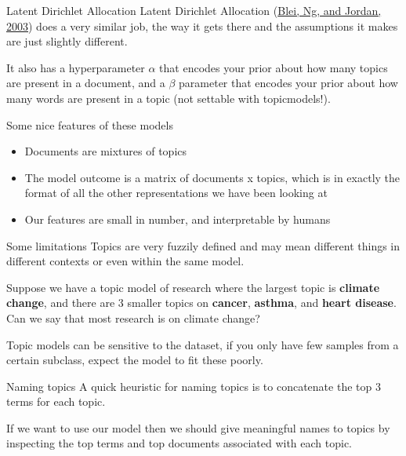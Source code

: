 \documentclass[
  10pt,
  ignorenonframetext,
  aspectratio=169]{beamer}
\providecommand{\tightlist}{%
  \setlength{\itemsep}{0pt}\setlength{\parskip}{0pt}}
\begin{document}
\begin{frame}{Latent Dirichlet Allocation}
\protect\hypertarget{latent-dirichlet-allocation}{}
Latent Dirichlet Allocation (\href{}{Blei, Ng, and Jordan, 2003}) does a
very similar job, the way it gets there and the assumptions it makes are
just slightly different.

It also has a hyperparameter \(\alpha\) that encodes your prior about
how many topics are present in a document, and a \(\beta\) parameter
that encodes your prior about how many words are present in a topic (not
settable with topicmodels!).
\end{frame}

\begin{frame}{Some nice features of these models}
\protect\hypertarget{some-nice-features-of-these-models}{}
\begin{itemize}
\tightlist
\item
  Documents are mixtures of topics
\item
  The model outcome is a matrix of documents x topics, which is in
  exactly the format of all the other representations we have been
  looking at
\item
  Our features are small in number, and interpretable by humans
\end{itemize}
\end{frame}

\begin{frame}{Some limitations}
\protect\hypertarget{some-limitations}{}
Topics are very fuzzily defined and may mean different things in
different contexts or even within the same model.

Suppose we have a topic model of research where the largest topic is
\textbf{climate change}, and there are 3 smaller topics on
\textbf{cancer}, \textbf{asthma}, and \textbf{heart disease}. Can we say
that most research is on climate change?

Topic models can be sensitive to the dataset, if you only have few
samples from a certain subclass, expect the model to fit these poorly.
\end{frame}

\begin{frame}{Naming topics}
\protect\hypertarget{naming-topics}{}
A quick heuristic for naming topics is to concatenate the top 3 terms
for each topic.

If we want to use our model then we should give meaningful names to
topics by inspecting the top terms and top documents associated with
each topic.
\end{frame}
\end{document}
